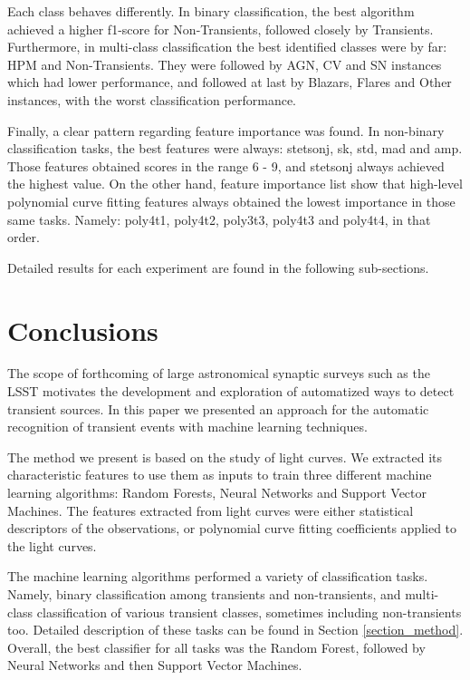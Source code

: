 \documentclass[a4paper,fleqn,usenatbib]{mnras}
\begin{document}
Each class behaves differently. 
In binary classification,
the best algorithm achieved a higher f1-score for Non-Transients,
followed closely by Transients. Furthermore, in multi-class
classification the best identified classes were by far: HPM and
Non-Transients. They were followed by AGN, CV and SN instances which
had lower performance, and followed at last by Blazars, Flares and
Other instances, with the worst classification performance.  


Finally, a clear pattern regarding feature importance was found. In non-binary classification tasks, the best features were always: stetson\textunderscore j, sk, std, mad and amp. Those features obtained scores in the range 6 - 9, and stetson\textunderscore j always achieved the highest value. On the other hand, feature importance list show that high-level polynomial curve fitting features always obtained the lowest importance in those same tasks. Namely: poly4\textunderscore t1, poly4\textunderscore t2, poly3\textunderscore t3, poly4\textunderscore t3 and poly4\textunderscore t4, in that order.

Detailed results for each experiment are found in the following sub-sections.


\section{Conclusions}

The scope of forthcoming of large astronomical synaptic surveys such
as the LSST \citep{0805.2366} motivates the development and
exploration of automatized ways to detect transient sources.
In this paper we presented an approach for the automatic recognition
of transient events with machine learning techniques.   

The method we present is based on the study of light curves. 
We extracted its characteristic features to use them as inputs
to train three different machine learning algorithms: Random Forests,
Neural Networks and Support Vector Machines.
The features extracted from light curves were either statistical
descriptors of the observations, or polynomial curve fitting
coefficients applied to the light curves.   

The machine learning algorithms performed a variety of classification tasks.
Namely, binary classification among transients and non-transients, and
multi-class classification of various transient classes, sometimes
including non-transients too. Detailed description of these tasks can
be found in Section \ref{section_method}.  
Overall, the best classifier for all tasks was the Random Forest,
followed by Neural Networks and then Support Vector Machines. 
\end{document}
